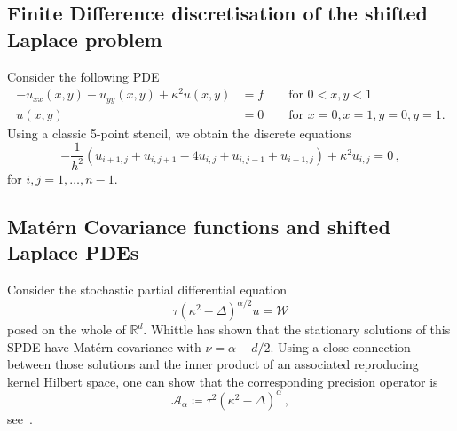 \documentclass[
fontsize=11pt,
paper=a4,
numbers=noenddot
]{scrartcl}
\begin{document}
\subsection{Finite Difference discretisation of the shifted Laplace problem}
Consider the following PDE
\begin{align*}
    -u_{xx}(x,y) - u_{yy}(x,y) + \kappa^2 u(x,y) &= f \qquad \text{for $0 < x,y < 1$} \\
    u(x,y) &= 0 \qquad \text{for $x = 0, x = 1, y = 0, y = 1$.}
\end{align*}
Using a classic 5-point stencil, we obtain the discrete equations
\begin{equation*}
    -\frac{1}{h^2}\left(
        u_{i+1,j} + u_{i,j+1} - 4u_{i,j} + u_{i,j-1} + u_{i-1,j}
    \right)
    + \kappa^2 u_{i,j} = 0\,,
\end{equation*}
for $i,j = 1,\dotsc,n-1$.

\subsection*{Mat\'ern Covariance functions and shifted Laplace PDEs}
Consider the stochastic partial differential equation
\begin{equation*}
    \tau {(\kappa^2 - \Delta)}^{\alpha / 2} u = \mathcal{W}
\end{equation*}
posed on the whole of $\mathbb{R}^d$. Whittle has shown that the stationary solutions of this SPDE have Mat\'ern covariance with $\nu = \alpha - d/2$. Using a close connection between those solutions and the inner product of an associated reproducing kernel Hilbert space, one can show that the corresponding precision operator is
\begin{equation*}
    \mathcal{A}_\alpha \coloneqq \tau^2 {(\kappa^2 - \Delta)}^\alpha\,,
\end{equation*}
see~\cite[Sec.\ 2.2]{lindgrenSPDEApproachGaussian2022}.


\printbibliography
\end{document}

